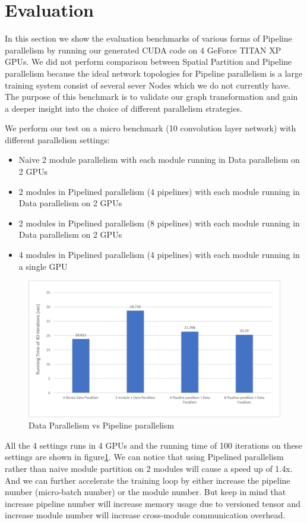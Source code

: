 \documentclass[sigplan]{acmart}\settopmatter{printfolios=true,printccs=false,printacmref=false}
\begin{document}
 \section{Evaluation}
 In this section we show the evaluation benchmarks of various forms of Pipeline parallelism by running our generated CUDA code on 4 GeForce TITAN XP GPUs. We did not perform comparison between Spatial Partition and Pipeline parallelism because the ideal network topologies for Pipeline parallelism is a large training system consist of several sever Nodes which we do not currently have. The purpose of this benchmark is to validate our graph transformation and gain a deeper insight into the choice of different parallelism strategies.\par
 We perform our test on a micro benchmark (10 convolution layer network) with different parallelism settings:
 \begin{itemize}
   \item Naive 2 module parallelism with each module running in Data parallelism on 2 GPUs
   \item 2 modules in Pipelined parallelism (4 pipelines) with each module running in Data parallelism on 2 GPUs
   \item 2 modules in Pipelined parallelism (8 pipelines) with each module running in Data parallelism on 2 GPUs
   \item 4 modules in Pipelined parallelism (4 pipelines) with each module running in a single GPU
 \end{itemize}
 \begin{figure}[htbp]
  \centering
  \includegraphics[scale=0.4]{runtime.png}
  \caption{Data Parallelism vs Pipeline parallelism}
  \label{fig:runtime}
\end{figure}
 All the 4 settings runs in 4 GPUs and the running time of 100 iterations on these settings are shown in figure\ref{fig:runtime}. We can notice that using Pipelined parallelism rather than naive module partition on 2 modules will cause a speed up of 1.4x. And we can further accelerate the training loop by either increase the pipeline number (micro-batch number) or the module number. But keep in mind that increase pipeline number will increase memory usage due to versioned tensor and increase module number will increase cross-module communication overhead.\par
\end{document}
